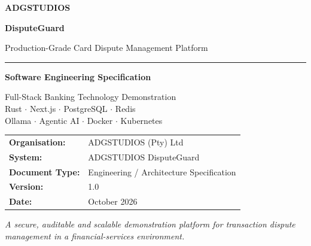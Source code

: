 \documentclass[11pt,a4paper]{article}
\begin{document}

\begin{titlepage}
    \centering

    \vspace*{2cm}

    {\Huge\bfseries ADGSTUDIOS\par}

    \vspace{0.5cm}

    {\LARGE\color{ADGBlue}\bfseries DisputeGuard\par}

    \vspace{0.5cm}

    {\Large Production-Grade Card Dispute Management Platform\par}

    \vspace{1.5cm}

    \rule{0.85\textwidth}{0.8pt}

    \vspace{1cm}

    {\Large\bfseries Software Engineering Specification\par}

    \vspace{0.5cm}

    {\large
    Full-Stack Banking Technology Demonstration\\
    Rust $\cdot$ Next.js $\cdot$ PostgreSQL $\cdot$ Redis\\
    Ollama $\cdot$ Agentic AI $\cdot$ Docker $\cdot$ Kubernetes
    \par}

    \vfill

    \begin{tabular}{ll}
        \textbf{Organisation:} & ADGSTUDIOS (Pty) Ltd \\
        \textbf{System:} & ADGSTUDIOS DisputeGuard \\
        \textbf{Document Type:} & Engineering / Architecture Specification \\
        \textbf{Version:} & 1.0 \\
        \textbf{Date:} & October 2026 \\
    \end{tabular}

    \vfill

    \textit{
    A secure, auditable and scalable demonstration platform for
    transaction dispute management in a financial-services environment.
    }

\end{titlepage}
\end{document}
